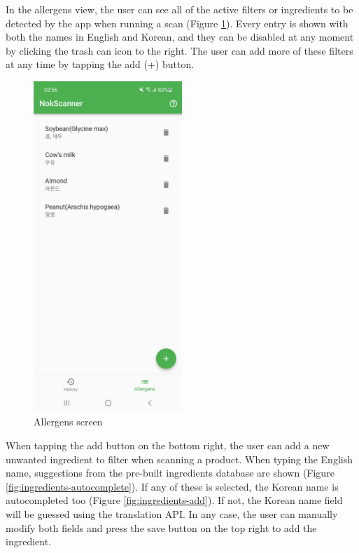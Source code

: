 In the allergens view, the user can see all of the active filters or ingredients to be detected by the app when running a scan (Figure \ref{fig:ingredients}). Every entry is shown with both the names in English and Korean, and they can be disabled at any moment by clicking the trash can icon to the right. The user can add more of these filters at any time by tapping the add (+) button.

\begin{figure}[h]
  \centering
  \includegraphics[width=0.5\textwidth]{Figures/Screenshot/ingredients.jpg}
  \caption{%
    Allergens screen
  }
  \label{fig:ingredients}
\end{figure}

\clearpage

When tapping the add button on the bottom right, the user can add a new unwanted ingredient to filter when scanning a product. When typing the English name, suggestions from the pre-built ingredients database are shown (Figure \ref{fig:ingredients-autocomplete}). If any of these is selected, the Korean name is autocompleted too (Figure \ref{fig:ingredients-add}). If not, the Korean name field will be guessed using the translation API. In any case, the user can manually modify both fields and press the save button on the top right to add the ingredient.

